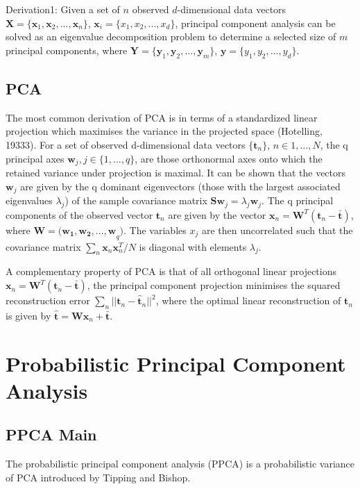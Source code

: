 \documentclass[ %
                    author={Dillon Keith Diep},
                supervisor={Dr. Carl Henrik Ek},
                    degree={MEng},
                     title={Assisted Content Generation for 3D Hair Geometry},
                  subtitle={[INCOMPLETE DRAFT, CONTAINS NOTES FROM RESEARCH]},
                      type={Research},
                      year={2014} ]{dissertation}
\begin{document}
Derivation1:
Given a set of $n$ observed $d$-dimensional data vectors $\mathbf{X}=\{\mathbf{x}_1,\mathbf{x}_2,...,\mathbf{x}_n\}$, $\mathbf{x}_i = \{x_1,x_2,...,x_d\}$, principal component analysis can be solved as an eigenvalue decomposition problem to determine a selected size of $m$ principal components, where $\mathbf{Y}=\{\mathbf{y}_1,\mathbf{y}_2,...,\mathbf{y}_m\}$, $\mathbf{y}=\{y_1,y_2,...,y_d\}$. 



\subsection{PCA}
The most common derivation of PCA is in terms of a standardized linear projection which maximises the variance in the projected space (Hotelling, 19333). For a set of observed d-dimensional data vectors $\{\mathbf{t}_n\}$, $n\in {1,...,N}$, the q principal axes $\mathbf{w}_j, j\in \{1,...,q\}$, are those orthonormal axes onto which the retained variance under projection is maximal. It can be shown that the vectors $\mathbf{w}_j$ are given by the q dominant eigenvectors (those with the largest associated eigenvalues $\lambda_j$) of the sample covariance matrix $\mathbf{Sw}_j=\lambda_j\mathbf{w}_j$. The q principal components of the observed vector $\mathbf{t}_n$ are given by the vector $\mathbf{x}_n=\mathbf{W}^T(\mathbf{t}_n-\mathbf{\bar{t}})$, where $\mathbf{W=(w_1,w_2,...,w}_q)$. The variables $x_j$ are then uncorrelated such that the covariance matrix $\sum_n\mathbf{x}_n\mathbf{x}^T_n /N$ is diagonal with elements $\lambda_j$.

A complementary property of PCA is that of all orthogonal linear projections $\mathbf{x}_n=\mathbf{W}^T(\mathbf{t}_n-\mathbf{\bar{t}})$, the principal component projection minimises the squared reconstruction error $\sum_n||\mathbf{t}_n-\mathbf{\hat{t}}_n||^2$, where the optimal linear reconstruction of $\mathbf{t}_n$ is given by $\mathbf{\hat{t}=Wx}_n+\mathbf{\bar{t}}$.

\section{Probabilistic Principal Component Analysis}

\subsection{PPCA Main}
The probabilistic principal component analysis (PPCA) is a probabilistic variance of PCA introduced by Tipping and Bishop\cite{PPCA}. 
\end{document}
